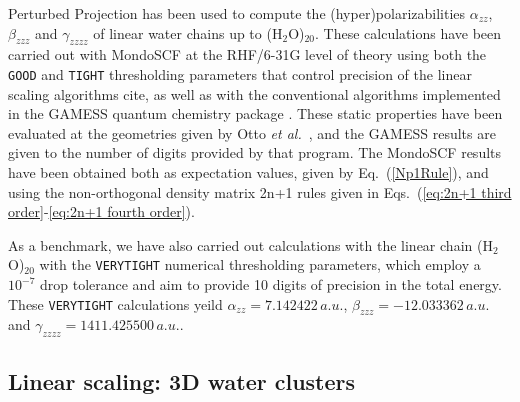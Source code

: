 \documentclass[prl,aps,letterpaper,twocolumn,showpacs,twocolumngrid,superbib]{revtex4}
\begin{document}
Perturbed Projection has been used to compute the (hyper)polarizabilities $\alpha_{zz}$, 
$\beta_{zzz}$ and $\gamma_{zzzz}$ of linear water chains up to (H$_2$O)$_{20}$. 
These calculations have been carried out with {\sc MondoSCF} at the RHF/6-31G level of theory using 
both the {\tt GOOD} and {\tt TIGHT} thresholding parameters that control precision of the 
linear scaling algorithms cite{}, as well as with the conventional algorithms implemented
in the {\sc GAMESS} quantum chemistry package \cite{gamess}.  These static properties have 
been evaluated at the geometries given by Otto {\em et al.}~\cite{POtto99}, and the GAMESS
results are given to the number of digits provided by that program.
The {\sc MondoSCF} results have been obtained both as expectation values, given by Eq.~(\ref{Np1Rule}), 
and using the non-orthogonal density matrix 2n+1 rules given in 
Eqs.~(\ref{eq:2n+1 third order}-\ref{eq:2n+1 fourth order}).

As a benchmark, we have also carried out calculations with the linear chain (H$_2$O)$_20$ with 
the {\tt VERYTIGHT} numerical thresholding parameters, which employ a $10^{-7}$ drop tolerance and
aim to provide 10 digits of precision in the total energy.   These {\tt VERYTIGHT} calculations yeild  
$\alpha_{zz}=7.142422\,a.u.$, $\beta_{zzz}=-12.033362\,a.u.$ and $\gamma_{zzzz}=1411.425500\,a.u.$. 

\newpage

\subsection{Linear scaling: 3D water clusters}
\end{document}
